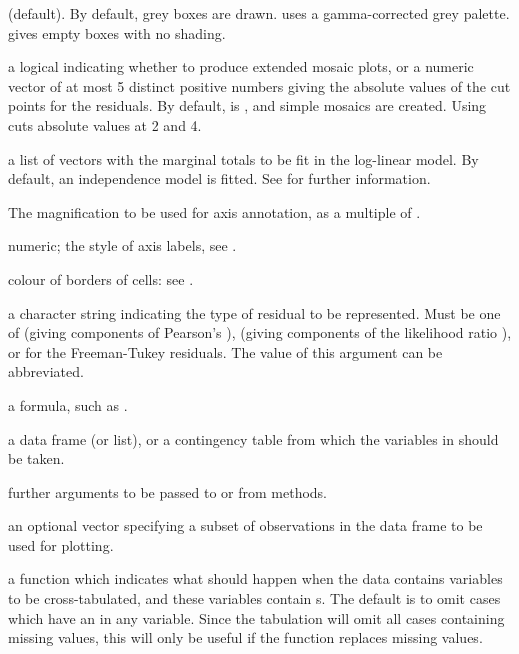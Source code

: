 \begin{Arguments}
\begin{ldescription}
(default).  By default, grey boxes are drawn.  
uses a gamma-corrected grey palette.   gives empty
boxes with no shading.
\item[\code{shade}] a logical indicating whether to produce extended mosaic
plots, or a numeric vector of at most 5 distinct positive numbers
giving the absolute values of the cut points for the residuals.  By
default,  is , and simple mosaics are
created.  Using  cuts absolute values at 2 and
4.
\item[\code{margin}] a list of vectors with the marginal totals to be fit in
the log-linear model.  By default, an independence model is fitted.
See  for further information.
\item[\code{cex.axis}] The magnification to be used for axis annotation,
as a multiple of .
\item[\code{las}] numeric; the style of axis labels, see .
\item[\code{border}] colour of borders of cells: see .
\item[\code{type}] a character string indicating the type of residual to be
represented.  Must be one of  (giving components of
Pearson's ),  (giving
components of the likelihood ratio ), or
 for the Freeman-Tukey residuals.  The value of this
argument can be abbreviated.
\item[\code{formula}] a formula, such as .
\item[\code{data}] a data frame (or list), or a contingency table from which
the variables in  should be taken.
\item[\code{...}] further arguments to be passed to or from methods.
\item[\code{subset}] an optional vector specifying a subset of observations
in the data frame to be used for plotting.
\item[\code{na.action}] a function which indicates what should happen
when the data contains variables to be cross-tabulated, and these
variables contain s.  The default is to omit cases which
have an  in any variable.  Since the tabulation will omit
all cases containing missing values, this will only be useful if the
 function replaces missing values.
\end{ldescription}
\end{Arguments}
